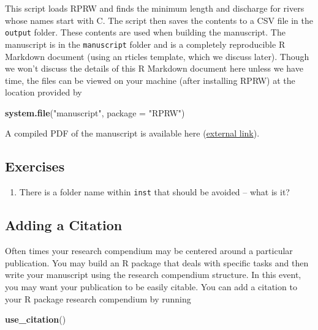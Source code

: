 \documentclass[
]{book}
\newenvironment{Shaded}{\begin{snugshade}}{\end{snugshade}}
\newcommand{\DataTypeTok}[1]{\textcolor[rgb]{0.13,0.29,0.53}{#1}}
\newcommand{\KeywordTok}[1]{\textcolor[rgb]{0.13,0.29,0.53}{\textbf{#1}}}
\newcommand{\NormalTok}[1]{#1}
\newcommand{\StringTok}[1]{\textcolor[rgb]{0.31,0.60,0.02}{#1}}
\providecommand{\tightlist}{%
  \setlength{\itemsep}{0pt}\setlength{\parskip}{0pt}}
\begin{document}
This script loads RPRW and finds the minimum length and discharge for rivers whose names start with C. The script then saves the contents to a CSV file in the \texttt{output} folder. These contents are used when building the manuscript. The manuscript is in the \texttt{manuscript} folder and is a completely reproducible R Markdown document (using an rticles template, which we discuss later). Though we won't discuss the details of this R Markdown document here unless we have time, the files can be viewed on your machine (after installing RPRW) at the location provided by

\begin{Shaded}
\begin{Highlighting}[]
\KeywordTok{system.file}\NormalTok{(}\StringTok{"manuscript"}\NormalTok{, }\DataTypeTok{package =} \StringTok{"RPRW"}\NormalTok{)}
\end{Highlighting}
\end{Shaded}

A compiled PDF of the manuscript is available here (\href{https://github.com/michaeldumelle/RPRW/blob/main/inst/manuscript/manuscript.pdf}{external link}).

\hypertarget{ex-set9}{%
\subsection{Exercises}\label{ex-set9}}

\begin{enumerate}
\def\labelenumi{\arabic{enumi}.}
\tightlist
\item
  There is a folder name within \texttt{inst} that should be avoided -- what is it?
\end{enumerate}

\hypertarget{citation}{%
\subsection{Adding a Citation}\label{citation}}

Often times your research compendium may be centered around a particular publication. You may build an R package that deals with specific tasks and then write your manuscript using the research compendium structure. In this event, you may want your publication to be easily citable. You can add a citation to your R package research compendium by running

\begin{Shaded}
\begin{Highlighting}[]
\KeywordTok{use_citation}\NormalTok{()}
\end{Highlighting}
\end{Shaded}
\end{document}
